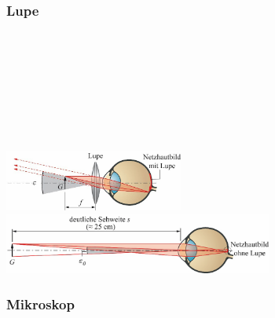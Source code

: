 \subsubsection{Lupe}

\begin{center}
	\begin{minipage}{0.18\textwidth}
		\\
		
		 \\
		 \\
		 \\
		 \\
		 \\
		 \\
	\end{minipage}%
	\begin{minipage}{0.3\textwidth}
		\includegraphics[height=2cm,keepaspectratio=true]{Images/lupe.png}
		\includegraphics[height=2cm,keepaspectratio=true]{Images/deutliche_sichtweite.png}
	\end{minipage}
\end{center}





\subsubsection{Mikroskop}

